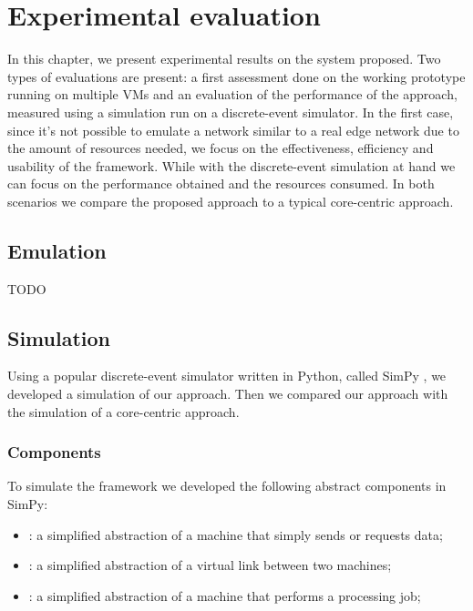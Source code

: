\chapter{Experimental evaluation}
\label{ch:experiments}

In this chapter, we present experimental results on the system proposed. Two types of evaluations are present: a first assessment done on the working prototype running on multiple \glspl{VM} and an evaluation of the performance of the approach, measured using a simulation run on a discrete-event simulator.
In the first case, since it's not possible to emulate a network similar to a real edge network due to the amount of resources needed, we focus on the effectiveness, efficiency and usability of the framework.
While with the discrete-event simulation at hand we can focus on the performance obtained and the resources consumed.
In both scenarios we compare the proposed approach to a typical core-centric approach.



\section{Emulation}
TODO



\section{Simulation}
Using a popular discrete-event simulator written in Python, called SimPy \cite{simpy}, we developed a simulation of our approach. Then we compared our approach with the simulation of a core-centric approach.


\subsection{Components}
To simulate the framework we developed the following abstract components in SimPy:
\begin{itemize}
    \item {}: a simplified abstraction of a machine that simply sends or requests data;
    \item {}: a simplified abstraction of a virtual link between two machines;
    \item {}: a simplified abstraction of a machine that performs a processing job;
\end{itemize}

